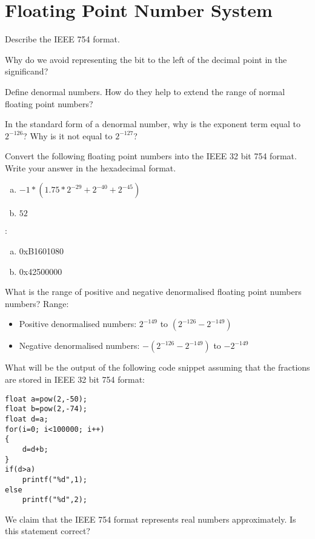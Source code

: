 \section*{Floating Point Number System}
\begin{ExerciseList}
\Exercise
Describe the IEEE 754 format.

\Exercise
Why do we avoid representing the bit to the left of the decimal point in the significand?

\Exercise
Define denormal numbers. How do they help to extend the range of normal floating point numbers?

\Exercise
In the standard form of a denormal number, why is the exponent term equal to $2^{-126}$? Why is
it not equal to $2^{-127}$?

\Exercise
Convert the following floating point numbers into the IEEE 32 bit 754 format. Write your answer in the
hexadecimal format.
\begin{enumerate}[a) ]
\item $-1 * (1.75 * 2^{-29} + 2^{-40} + 2^{-45})$
\item $52$
\end{enumerate}

\Answer :
\begin{enumerate}[a) ]
\item 0xB1601080
\item 0x42500000
\end{enumerate}

\Exercise
What is the range of positive and negative denormalised floating point numbers numbers?
\Answer Range:
\begin{itemize}
\item Positive denormalised numbers: $2^{-149}$ to $(2^{-126} - 2^{-149})$
\item Negative denormalised numbers: $-(2^{-126} - 2^{-149})$ to $-2^{-149}$
\end{itemize}



\Exercise
What will be the output of the following code snippet assuming that the fractions are stored in IEEE 32 bit 754 format:
\begin{Verbatim}[frame=single]
float a=pow(2,-50);
float b=pow(2,-74);
float d=a;
for(i=0; i<100000; i++)
{
	d=d+b;
}
if(d>a) 
	printf("%d",1);
else
	printf("%d",2);
\end{Verbatim}	


\Exercise
We claim that the IEEE 754 format represents real numbers approximately. Is this statement
correct?


\end{ExerciseList}
